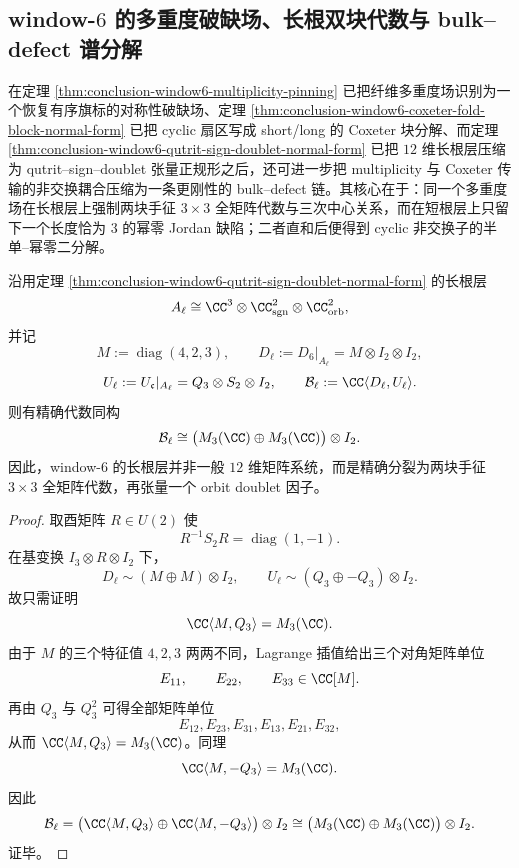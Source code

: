 \subsection{window-\texorpdfstring{$6$}{6} 的多重度破缺场、长根双块代数与 bulk--defect 谱分解}\label{subsec:conclusion-window6-multiplicity-bulk-defect-splitting}
在定理 \ref{thm:conclusion-window6-multiplicity-pinning} 已把纤维多重度场识别为一个恢复有序旗标的对称性破缺场、定理 \ref{thm:conclusion-window6-coxeter-fold-block-normal-form} 已把 cyclic 扇区写成 short/long 的 Coxeter 块分解、而定理 \ref{thm:conclusion-window6-qutrit-sign-doublet-normal-form} 已把 \(12\) 维长根层压缩为 qutrit--sign--doublet 张量正规形之后，还可进一步把 multiplicity 与 Coxeter 传输的非交换耦合压缩为一条更刚性的 bulk--defect 链。其核心在于：同一个多重度场在长根层上强制两块手征 \(3\times 3\) 全矩阵代数与三次中心关系，而在短根层上只留下一个长度恰为 \(3\) 的幂零 Jordan 缺陷；二者直和后便得到 cyclic 非交换子的半单--幂零二分解。

\begin{theorem}[长根层生成代数的精确双块化]\label{thm:conclusion-window6-long-root-generated-algebra-doubleblock}
沿用定理 \ref{thm:conclusion-window6-qutrit-sign-doublet-normal-form} 的长根层
\[
A_{\ell}\cong \CC^3\otimes \CC^2_{\mathrm{sgn}}\otimes \CC^2_{\mathrm{orb}},
\]
并记
\[
M:=\operatorname{diag}(4,2,3),
\qquad
D_{\ell}:=D_6|_{A_{\ell}}=M\otimes I_2\otimes I_2,
\]
\[
U_{\ell}:=U_{\mathfrak c}|_{A_{\ell}}=Q_3\otimes S_2\otimes I_2,
\qquad
\mathcal B_{\ell}:=\CC\langle D_{\ell},U_{\ell}\rangle.
\]
则有精确代数同构
\[
\mathcal B_{\ell}
\cong
\bigl(M_3(\CC)\oplus M_3(\CC)\bigr)\otimes I_2.
\]
因此，window-\(6\) 的长根层并非一般 \(12\) 维矩阵系统，而是精确分裂为两块手征 \(3\times 3\) 全矩阵代数，再张量一个 orbit doublet 因子。
\end{theorem}
\begin{proof}
取酉矩阵 \(R\in U(2)\) 使
\[
R^{-1}S_2R=\operatorname{diag}(1,-1).
\]
在基变换 \(I_3\otimes R\otimes I_2\) 下，
\[
D_{\ell}\sim (M\oplus M)\otimes I_2,
\qquad
U_{\ell}\sim (Q_3\oplus -Q_3)\otimes I_2.
\]
故只需证明
\[
\CC\langle M,Q_3\rangle=M_3(\CC).
\]
由于 \(M\) 的三个特征值 \(4,2,3\) 两两不同，Lagrange 插值给出三个对角矩阵单位
\[
E_{11},\qquad E_{22},\qquad E_{33}\in \CC[M].
\]
再由 \(Q_3\) 与 \(Q_3^2\) 可得全部矩阵单位
\[
E_{12},E_{23},E_{31},E_{13},E_{21},E_{32},
\]
从而 \(\CC\langle M,Q_3\rangle=M_3(\CC)\)。同理
\[
\CC\langle M,-Q_3\rangle=M_3(\CC).
\]
因此
\[
\mathcal B_{\ell}
=
\bigl(\CC\langle M,Q_3\rangle\oplus \CC\langle M,-Q_3\rangle\bigr)\otimes I_2
\cong
\bigl(M_3(\CC)\oplus M_3(\CC)\bigr)\otimes I_2.
\]
证毕。
\end{proof}

